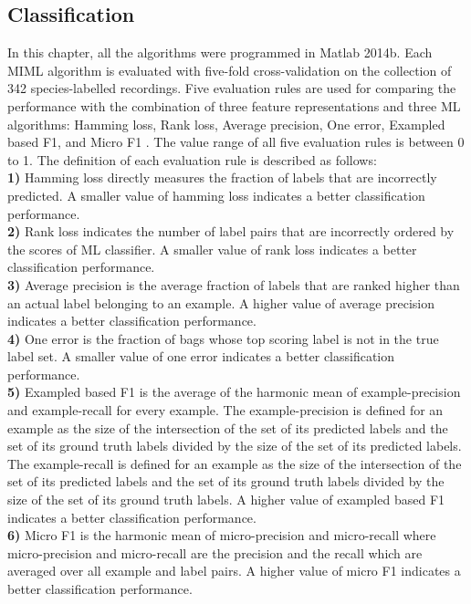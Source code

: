 \subsection{Classification}
In this chapter, all the algorithms were programmed in Matlab 2014b. Each MIML algorithm is evaluated with five-fold cross-validation on the collection of 342 species-labelled recordings. 
Five evaluation rules are used for comparing the performance with the combination of three feature representations and three ML algorithms: Hamming loss, Rank loss, Average precision, One error, Exampled based F1, and Micro F1 \citep{Madjarov20123084, zhou2008miml}. The value range of all five evaluation rules is between 0 to 1. The definition of each evaluation rule is described as follows:
\\
\textbf{1)} Hamming loss directly measures the fraction of labels that are incorrectly predicted. A smaller value of hamming loss indicates a better classification performance. 
\\
\textbf{2)} Rank loss indicates the number of label pairs that are incorrectly ordered by the scores of ML classifier. A smaller value of rank loss indicates a better classification performance.
\\
\textbf{3)} Average precision is the average fraction of labels that are ranked higher than an actual label belonging to an example. A higher value of average precision indicates a better classification performance.
\\
\textbf{4)} One error is the fraction of bags whose top scoring label is not in the true label set. A smaller value of one error indicates a better classification performance.
\\
\textbf{5)}
Exampled based F1 is the average of the harmonic mean of example-precision and example-recall for every example. The example-precision is defined for an example as the size of the intersection of the set of its predicted labels and the set of its ground truth labels divided by the size of the set of its predicted labels. The example-recall is defined for an example as the size of the intersection of the set of its predicted labels and the set of its ground truth labels divided by the size of the set of its ground truth labels. A higher value of exampled based F1 indicates a better classification performance.
\\
\textbf{6)}
Micro F1 is the harmonic mean of micro-precision and micro-recall where micro-precision and micro-recall are the precision and the recall which are averaged over all example and label pairs. A higher value of micro F1 indicates a better classification performance.


